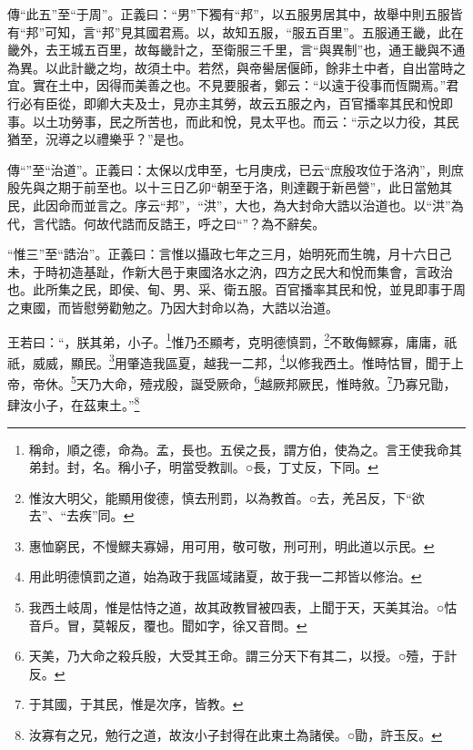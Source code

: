 {\noindent\zhuan{}\fzbyks 傳“此五”至“于周”。正義曰：“男”下獨有“邦”，以五服男居其中，故舉中則五服皆有“邦”可知，言“邦”見其國君焉。以，故知五服，“服五百里”。五服通王畿，此在畿外，去王城五百里，故每畿計之，至衛服三千里，言“與異制”也，通王畿與不通為異。以此計畿之均，故須土中。若然，與帝嚳居偃師，餘非土中者，自出當時之宜。實在土中，因得而美善之也。不見要服者，鄭云：“以遠于役事而恆闕焉。”君行必有臣從，即卿大夫及士，見亦主其勞，故云五服之內，百官播率其民和悅即事。以土功勞事，民之所苦也，而此和悅，見太平也。而云：“示之以力役，其民猶至，況導之以禮樂乎？”是也。 \par}

{\noindent\zhuan{}\fzbyks 傳“”至“治道”。正義曰：太保以戊申至，七月庚戌，已云“庶殷攻位于洛汭”，則庶殷先與之期于前至也。以十三日乙卯“朝至于洛，則達觀于新邑營”，此日當勉其民，此因命而並言之。序云“邦”，“洪”，大也，為大封命大誥以治道也。以“洪”為代，言代誥。何故代誥而反誥王，呼之曰“”？為不辭矣。 \par}

{\noindent\shu{}\fzkt “惟三”至“誥治”。正義曰：言惟以攝政七年之三月，始明死而生魄，月十六日己未，于時初造基趾，作新大邑于東國洛水之汭，四方之民大和悅而集會，言政治也。此所集之民，即侯、甸、男、采、衛五服。百官播率其民和悅，並見即事于周之東國，而皆慰勞勸勉之。乃因大封命以為，大誥以治道。 \par}

王若曰：“，朕其弟，小子。\footnote{稱命，順之德，命為。孟，長也。五侯之長，謂方伯，使為之。言王使我命其弟封。封，名。稱小子，明當受教訓。○長，丁丈反，下同。}惟乃丕顯考，克明德慎罰，\footnote{惟汝大明父，能顯用俊德，慎去刑罰，以為教首。○去，羌呂反，下“欲去”、“去疾”同。}不敢侮鰥寡，庸庸，祇祇，威威，顯民。\footnote{惠恤窮民，不慢鰥夫寡婦，用可用，敬可敬，刑可刑，明此道以示民。}用肇造我區夏，越我一二邦，\footnote{用此明德慎罰之道，始為政于我區域諸夏，故于我一二邦皆以修治。}以修我西土。惟時怙冒，聞于上帝，帝休。\footnote{我西土岐周，惟是怙恃之道，故其政教冒被四表，上聞于天，天美其治。○怙音戶。冒，莫報反，覆也。聞如字，徐又音問。}天乃大命，殪戎殷，誕受厥命，\footnote{天美，乃大命之殺兵殷，大受其王命。謂三分天下有其二，以授。○殪，于計反。}越厥邦厥民，惟時敘。\footnote{于其國，于其民，惟是次序，皆教。}乃寡兄勖，肆汝小子，在茲東土。”\footnote{汝寡有之兄，勉行之道，故汝小子封得在此東土為諸侯。○勖，許玉反。}


